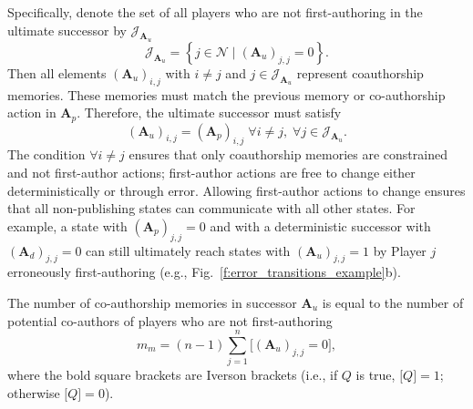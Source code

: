 \documentclass[12pt]{article}
\newcommand{\liver}[0]{\bm{[}}
\newcommand{\river}[0]{\bm{]}}
\begin{document}
Specifically, 
denote the set of all players who are not first-authoring 
in the ultimate successor 
by $\mathcal{J}_{\boldsymbol{A}_u}$
\begin{equation*}
    \mathcal{J}_{\boldsymbol{A}_u} = \left\{ j \in \mathcal{N} \mid (\boldsymbol{A}_{u})_{j, j} = 0 \right\}.
\end{equation*}
Then all elements $(\boldsymbol{A}_{u})_{i,j}$ with $i \neq j$ and $j \in \mathcal{J}_{\boldsymbol{A}_u}$ represent
coauthorship memories.
These memories must match the previous memory or co-authorship action in $\boldsymbol{A}_{p}$.
Therefore,
the ultimate successor must satisfy 
\begin{equation*}
    (\boldsymbol{A}_u)_{i, j} = (\boldsymbol{A}_p)_{i, j} 
    \; \forall i \neq j,
    \; \forall j \in \mathcal{J}_{\boldsymbol{A}_u}.
\end{equation*}
The condition $\forall i \neq j$ ensures that only coauthorship memories are constrained
and not first-author actions; 
first-author actions are free to change either deterministically or through error.
Allowing first-author actions to change
ensures that all non-publishing states can communicate with all other states.
For example,
a state with $(\boldsymbol{A}_p)_{j,j} = 0$ 
and with a deterministic successor with $(\boldsymbol{A}_d)_{j, j} = 0$
can still ultimately reach states with $(\boldsymbol{A}_u)_{j,j} = 1$ 
by Player $j$ erroneously first-authoring 
(e.g., Fig.~\ref{f:error_transitions_example}b).

The number of co-authorship memories in successor $\boldsymbol{A}_{u}$
is equal to the number of potential co-authors of players who are not first-authoring 
\begin{equation*}
    m_m = (n - 1) \sum_{j=1}^n \liver (\boldsymbol{A}_{u})_{j, j} = 0 \river,
\end{equation*}
where the bold square brackets are Iverson brackets 
(i.e., if $Q$ is true, $\liver Q \river = 1$; otherwise $\liver Q \river = 0$).
\end{document}
